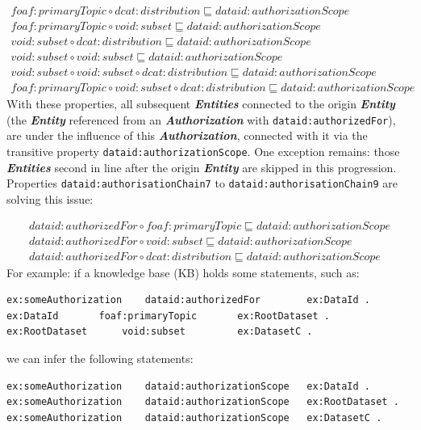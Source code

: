 \documentclass[a4paper,english,twoside,BCOR1.5cm,headsepline,DIV12,appendixprefix,final,12pt]{scrbook}
\newcommand{\prop}[1]{{{\texttt{#1}}}}
\newcommand{\important}[1]{\textbf{\textit{#1}}}
\begin{document}
{\footnotesize
\vspace*{-0.5cm}
\begin{align*}
foaf:primaryTopic \circ dcat:distribution \sqsubseteq dataid:authorizationScope\\
foaf:primaryTopic \circ void:subset \sqsubseteq dataid:authorizationScope\\
void:subset \circ dcat:distribution \sqsubseteq dataid:authorizationScope\\
void:subset \circ void:subset \sqsubseteq dataid:authorizationScope\\
void:subset \circ void:subset \circ dcat:distribution \sqsubseteq dataid:authorizationScope\\
foaf:primaryTopic \circ void:subset \circ dcat:distribution \sqsubseteq dataid:authorizationScope
\end{align*}
}%
With these properties, all subsequent \important{Entities} connected to the origin \important{Entity} (the \important{Entity} referenced from an \important{Authorization} with \prop{dataid:authorizedFor}), are under the influence of this \important{Authorization}, connected with it via the transitive property \prop{dataid:authorizationScope}. One exception remains: those \important{Entities} second in line after the origin \important{Entity} are skipped in this progression.
Properties \prop{dataid:authorisationChain7} to \prop{dataid:authorisationChain9} are solving this issue:

{\footnotesize
\vspace*{-0.5cm}
\begin{align*}
dataid:authorizedFor \circ foaf:primaryTopic \sqsubseteq dataid:authorizationScope\\
dataid:authorizedFor \circ void:subset \sqsubseteq dataid:authorizationScope\\
dataid:authorizedFor \circ dcat:distribution \sqsubseteq dataid:authorizationScope
\end{align*}
}%
For example: if a knowledge base (KB) holds some statements, such as:
\begin{lstlisting}[language=ttl, captionpos=b,label=lst:coresuperset,linewidth=\columnwidth,breaklines=true]
ex:someAuthorization	dataid:authorizedFor		ex:DataId .
ex:DataId		foaf:primaryTopic		ex:RootDataset .
ex:RootDataset		void:subset			ex:DatasetC . 
\end{lstlisting}

we can infer the following statements:
\begin{lstlisting}[language=ttl, captionpos=b,label=lst:coresuperset,linewidth=\columnwidth,breaklines=true]
ex:someAuthorization 	dataid:authorizationScope 	ex:DataId .
ex:someAuthorization 	dataid:authorizationScope 	ex:RootDataset .
ex:someAuthorization 	dataid:authorizationScope 	ex:DatasetC . 
\end{lstlisting}
\end{document}

